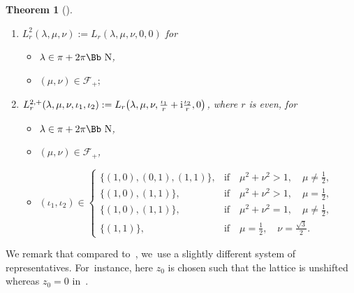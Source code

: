 \documentclass[10pt,a4paper]{amsart}
\newcommand\NN{{\mbox{\Bb N}}}
\newcommand\ZZ{{\mbox{\Bb Z}}}
\newcommand\SSS{{\mbox{\Bb S}}}
\newcommand\cF{{\mathcal F}}
\numberwithin{equation}{section}
\newtheorem{Theorem}{Theorem}[section]
\begin{document}
\begin{Theorem}[\cite{F}]
\begin{enumerate}
\begin{itemize}
\begin{gather*}
\begin{cases}
\\
\big\langle \left(\begin{smallmatrix}1&-1\\0&-1\end{smallmatrix}\right),\left(\begin{smallmatrix}1&-1\\1&0\end{smallmatrix}\right)\big\rangle\simeq D_6, & \text{if}\quad \mu=\frac{1}{2},\quad \nu=\frac{\sqrt{3}}{2},
\end{cases}
\end{gather*}
and $S\in\SSS$ acts on~$\iota\in\ZZ^2_r$
by
$S\cdot\iota=\det(S)S(\iota);$
\end{itemize}
%
\item[$2.$] $L^2_r(\lambda,\mu,\nu):=L_r(\lambda,\mu,\nu,0,0)$ for
\begin{itemize}
\item[$\circ$] $\lambda\in\pi+2\pi\NN$,
\item[$\circ$] $(\mu,\nu)\in\cF_+;$
\end{itemize}
%
\item[$3.$] $L^{2,+}_r(\lambda,\mu,\nu,\iota_1,\iota_2):= L_r\big(\lambda,\mu,\nu,\frac{\iota_1}{r}+{\rm i}\frac{\iota_2}{r},0\big)$, where $r$ is even, for
\begin{itemize}
\item[$\circ$] $\lambda\in\pi+2\pi\NN$,
\item[$\circ$] $(\mu,\nu)\in\cF_+$,
\item[$\circ$]
$(\iota_1,\iota_2)\in
\begin{cases}	
\{(1,0),(0,1),(1,1)\}, &\text{if}\quad
\mu^2+\nu^2>1,\quad \mu\neq\frac{1}{2 },
\\[0.5ex]
\{(1,0),(1,1)\}, &\text{if}\quad \mu^2+\nu^2>1,\quad \mu=\frac{1}{2},
\\[0.5ex]
\{(1,0),(1,1)\}, &\text{if}\quad \mu^2+\nu^2=1,\quad \mu\neq\frac{1}{2},\\%
\{(1,1)\} ,&\text{if}\quad \mu=\frac{1}{2},\quad \nu=\frac{\sqrt{3}}{2}.
\end{cases}$
\end{itemize}
\end{enumerate}
\end{Theorem}
We remark that compared to~\cite{F}, we~use a slightly different system of representatives. For~instance, here $z_0$ is chosen such that the lattice is unshifted whereas $z_0=0$ in~\cite{F}.
\end{document}
